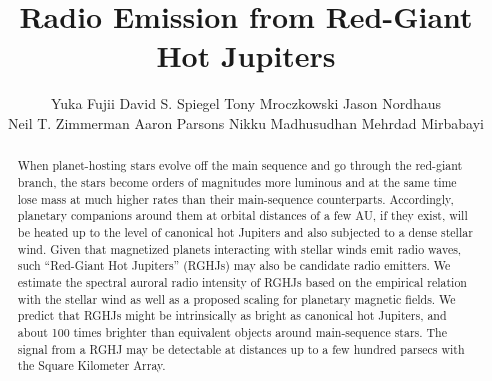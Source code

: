 \documentclass[iop,numberedappendix,apj]{emulateapj}
\begin{document}

\title{Radio Emission from Red-Giant Hot Jupiters}

\author{
%
Yuka Fujii 
%
David S. Spiegel
%
Tony Mroczkowski
%
Jason Nordhaus\\
%
Neil T. Zimmerman
%
Aaron Parsons
%
Nikku Madhusudhan
%
Mehrdad Mirbabayi
}

  









\vspace{0.5\baselineskip}



\begin{abstract}
When planet-hosting stars evolve off the main sequence and go through the red-giant branch, the stars become orders of magnitudes more luminous and at the same time lose mass at much higher rates than their main-sequence counterparts.
Accordingly, planetary companions around them at orbital distances of a few AU, if they exist, will be heated up to the level of canonical hot Jupiters and also subjected to a dense stellar wind.
Given that magnetized planets interacting with stellar winds emit radio waves, such ``Red-Giant Hot Jupiters'' (RGHJs) may also be candidate radio emitters.
We estimate the spectral auroral radio intensity of RGHJs based on the empirical relation with the stellar wind as well as a proposed scaling for planetary magnetic fields. 
We predict that RGHJs might be intrinsically as bright as canonical hot Jupiters, and about 100 times brighter than equivalent objects around main-sequence stars.  
The signal from a RGHJ may be detectable at distances up to a few hundred parsecs with the Square Kilometer Array. 
\end{abstract}
\end{document}
